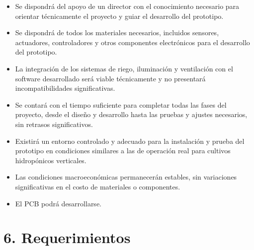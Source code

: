 \documentclass[
11pt, %
]{charter}
\begin{document}
\begin{itemize}
	\item Se dispondrá del apoyo de un director con el conocimiento necesario para orientar técnicamente el proyecto y guiar el desarrollo del prototipo.
	\item Se dispondrá de todos los materiales necesarios, incluidos sensores, actuadores, controladores y otros componentes electrónicos para el desarrollo del prototipo.
	\item La integración de los sistemas de riego, iluminación y ventilación con el software desarrollado será viable técnicamente y no presentará incompatibilidades significativas.
	\item  Se contará con el tiempo suficiente para completar todas las fases del proyecto, desde el diseño y desarrollo hasta las pruebas y ajustes necesarios, sin retrasos significativos.
	\item Existirá un entorno controlado y adecuado para la instalación y prueba del prototipo en condiciones similares a las de operación real para cultivos hidropónicos verticales.
	\item Las condiciones macroeconómicas permanecerán estables, sin variaciones significativas en el costo de materiales o componentes.
	\item El PCB podrá desarrollarse.
\end{itemize}


\section{6. Requerimientos}
\label{sec:requerimientos}

\end{document}
